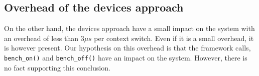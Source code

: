 \subsection{Overhead of the devices approach}

On the other hand, the devices approach have a small impact on the system with an overhead of less than $3\mu s$ per context switch.
Even if it is a small overhead, it is however present.
Our hypothesis on this overhead is that the framework calls, \texttt{bench\_on()} and \texttt{bench\_off()} have an impact on the system.
However, there is no fact supporting this conclusion.